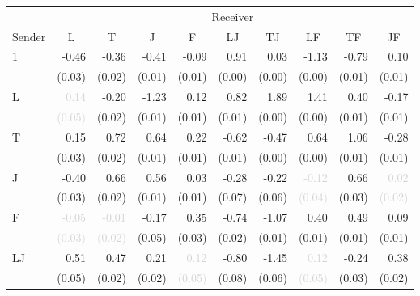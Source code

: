 \begin{tabular}{lrrrrrrrrr}
\toprule
& \multicolumn{9}{c}{Receiver} \\
\cmidrule(l){2-10} 
Sender & \multicolumn{1}{c}{L} & \multicolumn{1}{c}{T} & \multicolumn{1}{c}{J} & \multicolumn{1}{c}{F} & \multicolumn{1}{c}{LJ} & \multicolumn{1}{c}{TJ} & \multicolumn{1}{c}{LF} & \multicolumn{1}{c}{TF} & \multicolumn{1}{c}{JF} \\
\midrule
\multirow{2}{*}{1} &-0.46 &-0.36 &-0.41 &-0.09 &0.91 &0.03 &-1.13 &-0.79 &0.10\\
 &\tiny{(0.03)} &\tiny{(0.02)} &\tiny{(0.01)} &\tiny{(0.01)} &\tiny{(0.00)} &\tiny{(0.00)} &\tiny{(0.00)} &\tiny{(0.01)} &\tiny{(0.01)}\\[1ex]
\multirow{2}{*}{L} &\cellcolor{Gray}\textcolor{LightGray}{0.14} &-0.20 &-1.23 &0.12 &0.82 &1.89 &1.41 &0.40 &-0.17\\
 &\cellcolor{Gray}\textcolor{LightGray}{\tiny{(0.05)}} &\tiny{(0.02)} &\tiny{(0.01)} &\tiny{(0.01)} &\tiny{(0.01)} &\tiny{(0.00)} &\tiny{(0.00)} &\tiny{(0.01)} &\tiny{(0.01)}\\[1ex]
\multirow{2}{*}{T} &0.15 &\cellcolor{Gray}0.72 &0.64 &0.22 &-0.62 &-0.47 &0.64 &1.06 &-0.28\\
 &\tiny{(0.03)} &\cellcolor{Gray}\tiny{(0.02)} &\tiny{(0.01)} &\tiny{(0.01)} &\tiny{(0.01)} &\tiny{(0.00)} &\tiny{(0.00)} &\tiny{(0.01)} &\tiny{(0.01)}\\[1ex]
\multirow{2}{*}{J} &-0.40 &0.66 &\cellcolor{Gray}0.56 &0.03 &-0.28 &-0.22 &\textcolor{LightGray}{-0.12} &0.66 &\textcolor{LightGray}{0.02}\\
 &\tiny{(0.03)} &\tiny{(0.02)} &\cellcolor{Gray}\tiny{(0.01)} &\tiny{(0.01)} &\tiny{(0.07)} &\tiny{(0.06)} &\textcolor{LightGray}{\tiny{(0.04)}} &\tiny{(0.03)} &\textcolor{LightGray}{\tiny{(0.02)}}\\[1ex]
\multirow{2}{*}{F} &\textcolor{LightGray}{-0.05} &\textcolor{LightGray}{-0.01} &-0.17 &\cellcolor{Gray}0.35 &-0.74 &-1.07 &0.40 &0.49 &0.09\\
 &\textcolor{LightGray}{\tiny{(0.03)}} &\textcolor{LightGray}{\tiny{(0.02)}} &\tiny{(0.05)} &\cellcolor{Gray}\tiny{(0.03)} &\tiny{(0.02)} &\tiny{(0.01)} &\tiny{(0.01)} &\tiny{(0.01)} &\tiny{(0.01)}\\[1ex]
\multirow{2}{*}{LJ} &0.51 &0.47 &0.21 &\textcolor{LightGray}{0.12} &\cellcolor{Gray}-0.80 &-1.45 &\textcolor{LightGray}{0.12} &-0.24 &0.38\\
 &\tiny{(0.05)} &\tiny{(0.02)} &\tiny{(0.02)} &\textcolor{LightGray}{\tiny{(0.05)}} &\cellcolor{Gray}\tiny{(0.08)} &\tiny{(0.06)} &\textcolor{LightGray}{\tiny{(0.05)}} &\tiny{(0.03)} &\tiny{(0.02)}\\[1ex]

\end{tabular}
